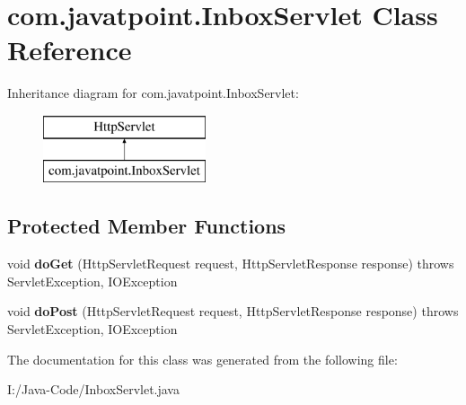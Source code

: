 \hypertarget{classcom_1_1javatpoint_1_1_inbox_servlet}{}\section{com.\+javatpoint.\+Inbox\+Servlet Class Reference}
\label{classcom_1_1javatpoint_1_1_inbox_servlet}
Inheritance diagram for com.\+javatpoint.\+Inbox\+Servlet\+:\begin{figure}[H]
\begin{center}
\leavevmode
\includegraphics[height=2.000000cm]{classcom_1_1javatpoint_1_1_inbox_servlet}
\end{center}
\end{figure}
\subsection*{Protected Member Functions}
\begin{DoxyCompactItemize}
\item 
\mbox{\label{classcom_1_1javatpoint_1_1_inbox_servlet_a38b9668a43c39c2c517e8f8aad31c9fa}} 
void {\bfseries do\+Get} (Http\+Servlet\+Request request, Http\+Servlet\+Response response)  throws Servlet\+Exception, I\+O\+Exception 
\item 
\mbox{\label{classcom_1_1javatpoint_1_1_inbox_servlet_a6a402222450de31d4d549a5a3ebcb156}} 
void {\bfseries do\+Post} (Http\+Servlet\+Request request, Http\+Servlet\+Response response)  throws Servlet\+Exception, I\+O\+Exception 
\end{DoxyCompactItemize}


The documentation for this class was generated from the following file\+:\begin{DoxyCompactItemize}
\item 
I\+:/\+Java-\/\+Code/Inbox\+Servlet.\+java\end{DoxyCompactItemize}
